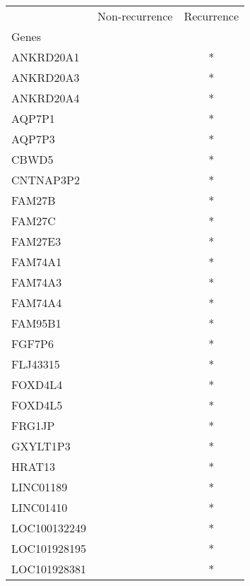 \begin{tabular}{lcc}
\toprule
{} & Non-recurrence & Recurrence \\
Genes              &                &            \\
\midrule
ANKRD20A1          &                &          * \\
ANKRD20A3          &                &          * \\
ANKRD20A4          &                &          * \\
AQP7P1             &                &          * \\
AQP7P3             &                &          * \\
CBWD5              &                &          * \\
CNTNAP3P2          &                &          * \\
FAM27B             &                &          * \\
FAM27C             &                &          * \\
FAM27E3            &                &          * \\
FAM74A1            &                &          * \\
FAM74A3            &                &          * \\
FAM74A4            &                &          * \\
FAM95B1            &                &          * \\
FGF7P6             &                &          * \\
FLJ43315           &                &          * \\
FOXD4L4            &                &          * \\
FOXD4L5            &                &          * \\
FRG1JP             &                &          * \\
GXYLT1P3           &                &          * \\
HRAT13             &                &          * \\
LINC01189          &                &          * \\
LINC01410          &                &          * \\
LOC100132249       &                &          * \\
LOC101928195       &                &          * \\
LOC101928381       &                &          * \\

\end{tabular}
